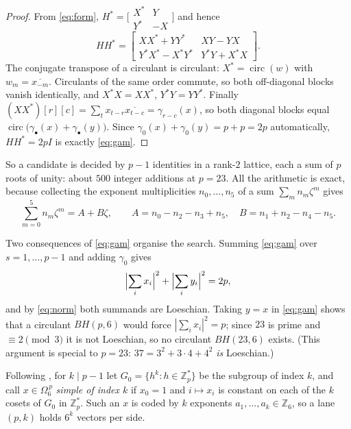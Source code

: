 \documentclass[11pt]{amsart}
\theoremstyle{remark}
\DeclareMathOperator{\circulant}{circ}
\newcommand{\zzz}{\zeta}
\newcommand{\Om}{\Omega}
\begin{document}
\begin{proof}
From \eqref{eq:form},
$H^{*}=\bigl[\begin{smallmatrix}X^{*}&Y\\Y^{*}&-X\end{smallmatrix}\bigr]$
and hence
\[
 HH^{*}=
 \begin{bmatrix}
  XX^{*}+YY^{*} & XY-YX\\
  Y^{*}X^{*}-X^{*}Y^{*} & Y^{*}Y+X^{*}X
 \end{bmatrix}.
\]
The conjugate transpose of a circulant is circulant: $X^{*}=\circulant(w)$
with $w_m=\overline{x_{-m}}$. Circulants of the same order commute, so both
off-diagonal blocks vanish identically, and $X^{*}X=XX^{*}$,
$Y^{*}Y=YY^{*}$. Finally
$(XX^{*})[r][c]=\sum_t x_{t-r}\overline{x_{t-c}}=\gamma_{r-c}(x)$, so both
diagonal blocks equal $\circulant\bigl(\gamma_{\bullet}(x)+\gamma_{\bullet}(y)\bigr)$.
Since $\gamma_0(x)+\gamma_0(y)=p+p=2p$ automatically, $HH^{*}=2pI$ is
exactly \eqref{eq:gam}.
\end{proof}

So a candidate is decided by $p-1$ identities in a rank-$2$ lattice, each a
sum of $p$ roots of unity: about $500$ integer additions at $p=23$. All the
arithmetic is exact, because collecting the exponent multiplicities
$n_0,\ldots,n_5$ of a sum $\sum_m n_m\zzz^m$ gives
\begin{equation}\label{eq:red}
 \sum_{m=0}^{5}n_m\zzz^{m}=A+B\zzz,
 \qquad A=n_0-n_2-n_3+n_5,\quad B=n_1+n_2-n_4-n_5 .
\end{equation}

Two consequences of \eqref{eq:gam} organise the search. Summing
\eqref{eq:gam} over $s=1,\ldots,p-1$ and adding $\gamma_0$ gives
\begin{equation}\label{eq:split}
 \Bigl|\sum_i x_i\Bigr|^{2}+\Bigl|\sum_i y_i\Bigr|^{2}=2p,
\end{equation}
and by \eqref{eq:norm} both summands are Loeschian. Taking $y=x$ in
\eqref{eq:gam} shows that a circulant $BH(p,6)$ would force
$|\sum_ix_i|^{2}=p$; since $23$ is prime and $\equiv2\pmod3$ it is not
Loeschian, so no circulant $BH(23,6)$ exists. (This argument is
special to $p=23$: $37=3^{2}+3\cdot4+4^{2}$ \emph{is} Loeschian.)

Following \cite{CMS}, for $k\mid p-1$ let $G_0=\{h^{k}:h\in\mathbb Z_p^{*}\}$
be the subgroup of index $k$, and call $x\in\Om_6^{\,p}$ \emph{simple of
index $k$} if $x_0=1$ and $i\mapsto x_i$ is constant on each of the $k$
cosets of $G_0$ in $\mathbb Z_p^{*}$. Such an $x$ is coded by $k$ exponents
$a_1,\ldots,a_k\in\mathbb Z_6$, so a lane $(p,k)$ holds $6^{k}$ vectors per
side.
\end{document}
